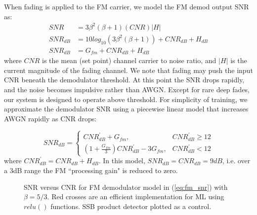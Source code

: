 \documentclass{article}
\begin{document}
When fading is applied to the FM carrier, we model the FM demod output SNR as:
\begin{equation}
\begin{split}
SNR &= 3\beta^2(\beta+1)(CNR)|H| \\
SNR_{dB} &= 10log_{10}(3\beta^2(\beta+1)) + CNR_{dB} + H_{dB} \\
SNR_{dB} &= G_{fm} + CNR_{dB} + H_{dB}
\end{split}
\end{equation}
where $CNR$ is the mean (set point) channel carrier to noise ratio, and $|H|$ is the current magnitude of the fading channel.  We note that fading may push the input CNR beneath the demodulator threshold.  At this point the SNR drops rapidly, and the noise becomes impulsive rather than AWGN. Except for rare deep fades, our system is designed to operate above threshold.  For simplicity of training, we approximate the demodulator SNR using a piecewise linear model that increases AWGN rapidly as CNR drops:

\begin{equation}
\label{eq:fm_snr}
SNR_{dB} = \begin{cases}
           CNR^{\prime}_{dB} + G_{fm}, & CNR^{\prime}_{dB} \ge 12 \\
           (1 + \frac{G_{fm}}{3})CNR^{\prime}_{dB} - 3G_{fm}, & CNR^{\prime}_{dB} < 12
	       \end{cases}
\end{equation}
where $CNR^{\prime}_{dB} = CNR_{dB} + H_{dB}$. In this model, $SNR_{dB}=CNR_{dB}=9 \si{dB}$, i.e. over a 3dB range the FM ``processing gain" is reduced to zero.

\begin{figure}[H]
\caption{SNR versus CNR for FM demodulator model in (\ref{eq:fm_snr}) with $\beta=5/3$. Red crosses are an efficient implementation for ML using $relu()$ functions. SSB product detector plotted as a control.}
\label{fig:fm_cnr_snr}
\begin{center}

\end{center}
\end{figure}
\end{document}
